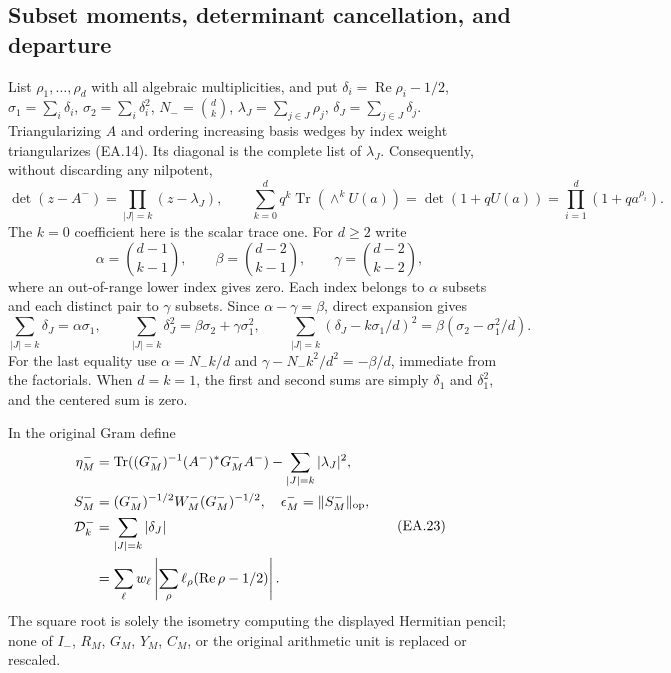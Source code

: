 \subsection{Subset moments, determinant cancellation, and departure}

List \(\rho_1,\ldots,\rho_d\) with all algebraic multiplicities,
and put \(\delta_i=\operatorname{Re}\rho_i-1/2\),
\(\sigma_1=\sum_i\delta_i\), \(\sigma_2=\sum_i\delta_i^2\),
\(N_-=\binom dk\), \(\lambda_J=\sum_{j\in J}\rho_j\),
\(\delta_J=\sum_{j\in J}\delta_j\).  Triangularizing \(A\)
and ordering increasing basis wedges by index weight triangularizes
(EA.14).  Its diagonal is the complete list of \(\lambda_J\).
Consequently, without discarding any nilpotent,
\[
 \det(z-A^-)=\prod_{|J|=k}(z-\lambda_J),\qquad
 \sum_{k=0}^d q^k\operatorname{Tr}(\wedge^k U(a))
                  =\det(1+qU(a))=\prod_{i=1}^d(1+qa^{\rho_i}).
 \tag{EA.20}
\]
The \(k=0\) coefficient here is the scalar trace one.
For \(d\ge2\) write
\[
 \alpha=\binom{d-1}{k-1},\qquad
 \beta=\binom{d-2}{k-1},\qquad
 \gamma=\binom{d-2}{k-2},
 \tag{EA.21}
\]
where an out-of-range lower index gives zero.  Each index belongs to
\(\alpha\) subsets and each distinct pair to \(\gamma\) subsets.
Since \(\alpha-\gamma=\beta\), direct expansion gives
\[
 \sum_{|J|=k}\delta_J=\alpha\sigma_1,\qquad
 \sum_{|J|=k}\delta_J^2=\beta\sigma_2+\gamma\sigma_1^2,
 \qquad
 \sum_{|J|=k}(\delta_J-k\sigma_1/d)^2
                 =\beta(\sigma_2-\sigma_1^2/d).
 \tag{EA.22}
\]
For the last equality use \(\alpha=N_-k/d\) and
\(\gamma-N_-k^2/d^2=-\beta/d\), immediate from the
factorials.  When \(d=k=1\), the first and second sums are simply
\(\delta_1\) and \(\delta_1^2\), and the centered sum is zero.

In the original Gram define
\[
 \begin{split}
 \eta_M^-&=\operatorname{Tr}((G_M^-)^{-1}(A^-)^*G_M^-A^-)
                                      -\sum_{|J|=k}|\lambda_J|^2,\\
 S_M^-&=(G_M^-)^{-1/2}W_M^-(G_M^-)^{-1/2},\quad
 \epsilon_M^-=\|S_M^-\|_{\rm op},\\
 \mathcal D_k^-&=\sum_{|J|=k}|\delta_J|\\
 &=\sum_\ell w_\ell\left|\sum_\rho\ell_\rho
                                  (\operatorname{Re}\rho-1/2)\right|.
 \end{split}\tag{EA.23}
\]
The square root is solely the isometry computing the displayed
Hermitian pencil; none of \(I_-\), \(R_M\), \(G_M\), \(Y_M\), \(C_M\), or the original
arithmetic unit is replaced or rescaled.

